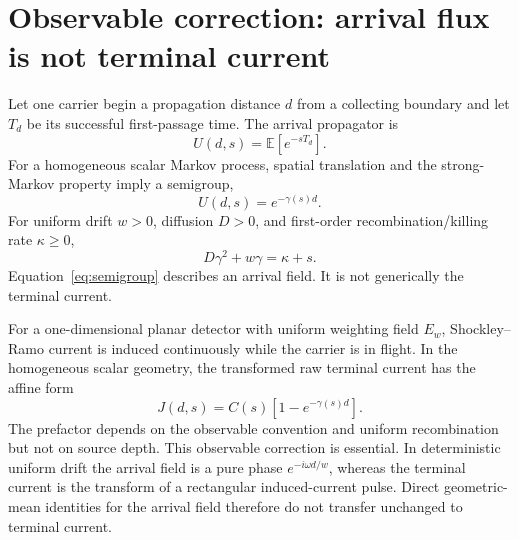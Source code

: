 \documentclass[11pt]{article}
\newcommand{\E}{\mathbb{E}}
\begin{document}
\section{Observable correction: arrival flux is not terminal current}
Let one carrier begin a propagation distance $d$ from a collecting boundary and let $T_d$ be its successful first-passage time. The arrival propagator is
\begin{equation}
U(d,s)=\E[e^{-sT_d}].
\end{equation}
For a homogeneous scalar Markov process, spatial translation and the strong-Markov property imply a semigroup,
\begin{equation}
\boxed{U(d,s)=e^{-\gamma(s)d}.}
\label{eq:semigroup}
\end{equation}
For uniform drift $w>0$, diffusion $D>0$, and first-order recombination/killing rate $\kappa\ge0$,
\begin{equation}
\boxed{D\gamma^2+w\gamma=\kappa+s.}
\label{eq:dispersion}
\end{equation}
Equation~\eqref{eq:semigroup} describes an arrival field. It is not generically the terminal current.

For a one-dimensional planar detector with uniform weighting field $E_w$, Shockley--Ramo current is induced continuously while the carrier is in flight. In the homogeneous scalar geometry, the transformed raw terminal current has the affine form
\begin{equation}
\boxed{J(d,s)=C(s)\left[1-e^{-\gamma(s)d}\right].}
\label{eq:Jaffine}
\end{equation}
The prefactor depends on the observable convention and uniform recombination but not on source depth. This observable correction is essential. In deterministic uniform drift the arrival field is a pure phase $e^{-i\omega d/w}$, whereas the terminal current is the transform of a rectangular induced-current pulse. Direct geometric-mean identities for the arrival field therefore do not transfer unchanged to terminal current.
\end{document}
